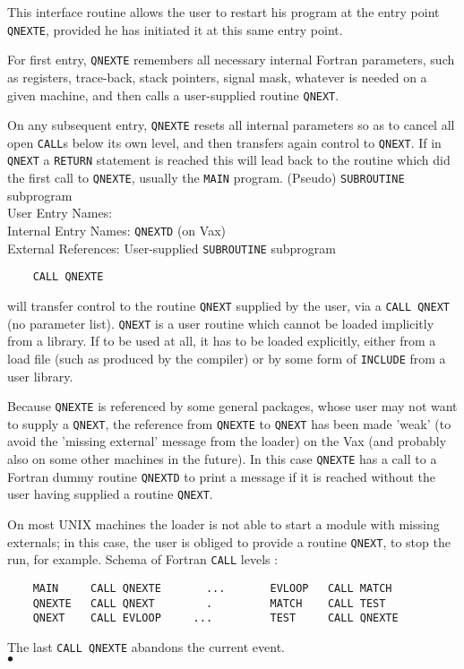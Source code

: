                           
\Submitter{}                                   
This interface routine allows the user to restart
his program at the entry point {\tt QNEXTE}, provided he has initiated
it at this same entry point.
\par
For first entry, {\tt QNEXTE} remembers all necessary internal
Fortran parameters, such as registers, trace-back, stack pointers,
signal mask, whatever is needed on a given machine, and then calls a
user-supplied routine {\tt QNEXT}.
\par
On any subsequent entry, {\tt QNEXTE} resets all internal parameters so
as to cancel all open {\tt CALL}s below its own level, and then
transfers again control to  {\tt QNEXT}. If in {\tt QNEXT} a {\tt RETURN}
statement is reached this will lead back to the routine which did the
first call to {\tt QNEXTE}, usually the {\tt MAIN} program.
\Structure
(Pseudo) {\tt SUBROUTINE} subprogram \\
User Entry Names: \\
Internal Entry Names: {\tt QNEXTD} (on Vax) \\
External References: User-supplied {\tt SUBROUTINE} subprogram
\Usage
\begin{verbatim}
    CALL QNEXTE
\end{verbatim}
will transfer control to the routine {\tt QNEXT} supplied by the user,
via a {\tt CALL QNEXT} (no parameter list).
\Notes
{\tt QNEXT} is a user routine which cannot be loaded implicitly from a
library. If to be used at all, it has to be loaded explicitly, either
from a load file (such as produced by the compiler) or by some form of
{\tt INCLUDE} from a user library.
\par
Because {\tt QNEXTE} is referenced by some general packages, whose
user may not want to supply a {\tt QNEXT}, the reference from
{\tt QNEXTE} to {\tt QNEXT} has been made 'weak' (to avoid the 'missing
external' message from the loader) on the Vax (and probably also on some
other machines in the future). In this case {\tt QNEXTE} has a call to a
Fortran dummy routine {\tt QNEXTD} to print a message if it is
reached without the user having supplied a routine {\tt QNEXT}.
\par
On most UNIX machines the loader is not able to start a module with
missing externals; in this case, the user is obliged to provide a
routine {\tt QNEXT}, to stop the run, for example.
\Examples
Schema of Fortran {\tt CALL} levels :
\begin{verbatim}
    MAIN     CALL QNEXTE       ...       EVLOOP   CALL MATCH
    QNEXTE   CALL QNEXT        .         MATCH    CALL TEST
    QNEXT    CALL EVLOOP     ...         TEST     CALL QNEXTE
\end{verbatim}
The last {\tt CALL QNEXTE} abandons the current event.
\\ $\bullet$
